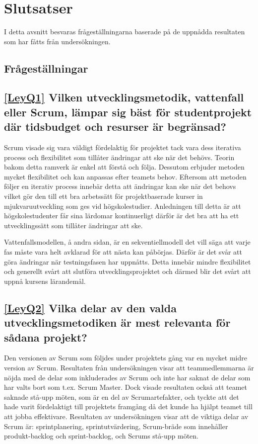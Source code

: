 \section{Slutsatser}
\label{sec:Lieth_Wahid-conclusion}
I detta avsnitt besvaras frågeställningarna baserade på de uppnådda resultaten som har fåtts från undersökningen.
\subsection{Frågeställningar}

\subsection*{\ref{LeyQ1} Vilken utvecklingsmetodik, vattenfall eller Scrum, lämpar sig bäst för studentprojekt där tidsbudget och resurser är begränsad?}
Scrum visade sig vara väldigt fördelaktig för projektet tack vara dess iterativa process och flexibilitet som tillåter ändringar att ske när det behövs. Teorin bakom detta ramverk är enkel att förstå och följa. Dessutom erbjuder metoden mycket flexibilitet och kan anpassas efter teamets behov. Eftersom att metoden följer en iterativ process innebär detta att ändringar kan ske när det behovs vilket gör den till ett bra arbetssätt för projektbaserade kurser in mjukvaruutveckling som ges vid högskolestudier. Anledningen till detta är att högskolestudenter får sina lärdomar kontinuerligt därför är det bra att ha ett utvecklingssätt som tillåter ändringar att ske.
	
Vattenfallsmodellen, å andra sidan, är en sekventiellmodell det vill säga att varje fas måste vara helt avklarad för att nästa kan påbörjas. Därför är det svår att göra ändringar när testningsfasen har uppnåtts. Detta innebär mindre flexibilitet och generellt svårt att slutföra utvecklingsprojektet och därmed blir det svårt att uppnå kursens lärandemål.
		
\subsection*{\ref{LeyQ2} Vilka delar av den valda utvecklingsmetodiken är mest relevanta för sådana projekt? }
Den versionen av Scrum som följdes under projektets gång var en mycket midre version av Scrum. Resultaten från undersökningen visar att teammedlemmarna är nöjda med de delar som inkluderades av Scrum och inte har saknat de delar som har valts bort som t.ex. Scrum Master. Dock visade resultaten också att teamet saknade stå-upp möten, som är en del av Scrumartefakter, och tyckte att det hade varit fördelaktigt till projektets framgång då det kunde ha hjälpt teamet till att jobba effektivare. Resultaten av undersökningen visar att de viktiga delar av Scrum är: sprintplanering, sprintutvärdering, Scrum-bräde som innehåller produkt-backlog och sprint-backlog, och Scrums stå-upp möten.